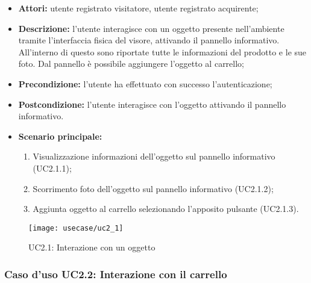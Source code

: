 \begin{itemize}
	\item \textbf{Attori:} utente registrato visitatore, utente registrato acquirente;
	\item \textbf{Descrizione:} l'utente interagisce con un oggetto presente nell'ambiente tramite l'interfaccia fisica del visore, attivando il pannello informativo. All'interno di questo sono riportate tutte le informazioni del prodotto e le sue foto. Dal pannello è possibile aggiungere l'oggetto al carrello;
	\item \textbf{Precondizione:} l'utente ha effettuato con successo l'autenticazione;
	\item \textbf{Postcondizione:} l'utente interagisce con l'oggetto attivando il pannello informativo.
	\item \textbf{Scenario principale:}
	\begin{enumerate}
		\item Visualizzazione informazioni dell'oggetto sul pannello informativo (UC2.1.1);
		\item Scorrimento foto dell'oggetto sul pannello informativo (UC2.1.2);
		\item Aggiunta oggetto al carrello selezionando l'apposito pulsante (UC2.1.3).
	\end{enumerate}
\end{itemize}

\label{UC2.1}
\begin{figure}[ht]
	\begin{center}
		\texttt{[image: usecase/uc2\_1]}
		\caption{UC2.1: Interazione con un oggetto}
	\end{center}
\end{figure}
\FloatBarrier

\subsubsection{Caso d'uso UC2.2: Interazione con il carrello}

